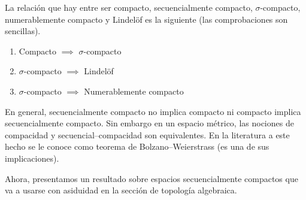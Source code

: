\begin{obs}
	\label{comp_obs_relacion_defs_compacidad}
	La relación que hay entre ser compacto, secuencialmente compacto, $\sigma$-compacto, numerablemente compacto y Lindelöf es la siguiente (las comprobaciones son sencillas).
	\begin{enumerate}
		\item Compacto $\implies$ $\sigma$-compacto
		\item $\sigma$-compacto $\implies$ Lindelöf
		\item $\sigma$-compacto $\implies$ Numerablemente compacto
	\end{enumerate}
	En general, secuencialmente compacto no implica compacto ni compacto implica secuencialmente compacto. Sin embargo en un espacio métrico, las nociones de compacidad y secuencial--compacidad son equivalentes. En la literatura a este hecho se le conoce como teorema de Bolzano--Weierstrass (es una de sus implicaciones).
\end{obs}

Ahora, presentamos un resultado sobre espacios secuencialmente compactos que va a usarse con asiduidad en la sección de topología algebraica.

